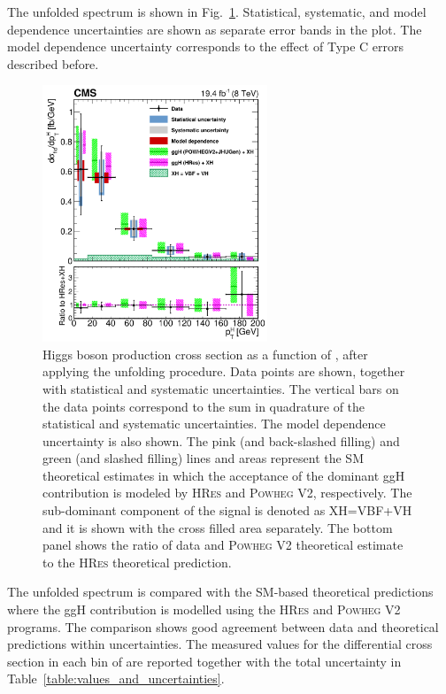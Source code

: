The unfolded \pth spectrum is shown in Fig.~\ref{fig:unfolded}. Statistical, systematic, and model dependence uncertainties are shown as separate error bands in the plot. The model dependence uncertainty corresponds to the effect of Type C errors described before.
\begin{figure}[htb]
\centering
\includegraphics[width=0.6\textwidth]{images/unblinding/pthRatio_unfolded_paper.pdf}
\caption{Higgs boson production cross section as a function of \pth{}, after applying the unfolding procedure.
Data points are shown, together with statistical and systematic uncertainties. The vertical bars on the data points correspond to the sum in quadrature of the statistical and systematic uncertainties. The model dependence uncertainty is also shown.
The pink (and back-slashed filling) and green (and slashed filling) lines and areas represent the SM theoretical estimates in which the acceptance of the dominant ggH contribution is modeled by \textsc{HRes} and \textsc{Powheg V2}, respectively. The sub-dominant component of the signal is denoted as XH=VBF+VH and it is shown with the cross filled area separately. The bottom panel shows the ratio of data and \textsc{Powheg V2} theoretical estimate to the \textsc{HRes} theoretical prediction.}\label{fig:unfolded}
\end{figure}

The unfolded spectrum is compared with the SM-based theoretical predictions where the ggH contribution is modelled using the \textsc{HRes} and \textsc{Powheg V2} programs. The comparison shows good agreement between data and theoretical predictions within uncertainties.
The measured values for the differential cross section in each bin of \pth are reported together with the total uncertainty in Table~\ref{table:values_and_uncertainties}.
 
